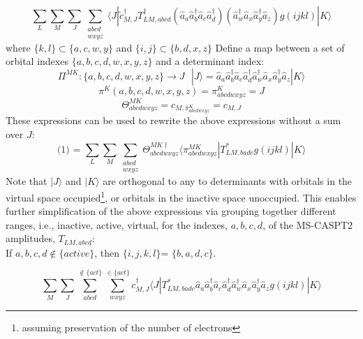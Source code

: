 \documentclass[12pt]{article}
\begin{document}
\begin{equation*}
\sum_{L} \sum_{M}\sum_{J}\sum_{\substack{abcd\\ wxyz}} 
\langle J |\tilde{c}^{\dagger}_{M,J} T^{\dagger}_{LM,abcd}(\hat{a}_{a}\hat{a}^{\dagger}_{b}
\hat{a}_{c}\hat{a}^{\dagger}_{d})(\hat{a}^{\dagger}_{w}\hat{a}_{x}\hat{a}^{\dagger}_{y}\hat{a}_{z})g(ijkl)|K\rangle
\end{equation*}
where $\{k,l\}\subset \{a,c,w,y\}$ and $\{i,j\}\subset \{b,d,x,z\}$
\noindent Define a map between a set of orbital indexes $\{a,b,c,d,w,x,y,z\}$ and a determinant index:
\begin{equation*}
\Pi^{MK} : \{a,b,c,d,w,x,y,z\} \rightarrow J
 \text{ \ \ \ \ \ \ \ \ \ \ } | J\rangle = \hat{a}_{a}\hat{a}^{\dagger}_{b}
\hat{a}_{c}\hat{a}^{\dagger}_{d}\hat{a}^{\dagger}_{w}\hat{a}_{x}\hat{a}^{\dagger}_{y}\hat{a}_{z}|K\rangle 
\end{equation*}
\begin{equation*}
\pi^{K} (a,b,c,d,w,x,y,z) =\pi^{K}_{abcdwxyz}= J 
\end{equation*}
\begin{equation*}
\Theta^{MK}_{abcdwxyz} = c_{M,\pi^{K}_{abcdwxyz}} = c_{M,J} 
\end{equation*}
These expressions can be used to rewrite the above expressions without a sum over $J$:
\begin{equation*}
\text{(1) = } \sum_{L} \sum_{M}  \sum_{\substack{abcd\\ wxyz}}\Theta^{MK\dagger}_{abcdwxyz} \langle \pi^{MK}_{abcdwxyz} |T^{*}_{LM,badc}g(ijkl)|K\rangle
\end{equation*}
Note that $|J\rangle$ and $|K\rangle$ are orthogonal to
any to determinants with orbitals in the virtual space occupied\footnote{assuming preservation of the number of electrons},
or orbitals in the inactive space unoccupied. This enables further simplification of the above expressions via grouping together
different ranges, i.e., inactive, active, virtual, for the indexes, $a,b,c,d$, of the MS-CASPT2 amplitudes, $T_{LM,abcd}$:\\

\noindent If $a,b,c,d \notin \{active\} $, then $\{i,j,k,l\} $= $\{b,a,d,c\}$.
 
\begin{equation*}
 \sum_{M} \sum_{J} \sum_{abcd}^{\notin \{act\} } \sum_{wxyz}^{\in\{act\}}
 c^{\dagger}_{M,J}  \langle J|T^{*}_{LM,badc}\hat{a}_{a}\hat{a}^{\dagger}_{b}
\hat{a}_{c}\hat{a}^{\dagger}_{d}\hat{a}^{\dagger}_{w}\hat{a}_{x}\hat{a}^{\dagger}_{y}\hat{a}_{z}g(ijkl) |K  \rangle
\end{equation*}
 
\end{document}
